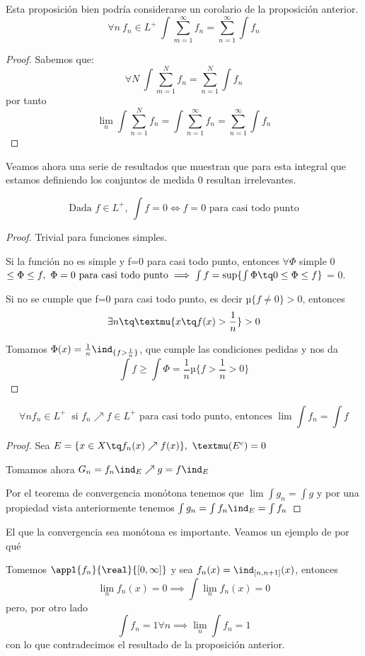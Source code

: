 \documentclass{apuntes}
\begin{document}
\begin{prop}
Esta proposición bien podría considerarse un corolario de la proposición anterior.
\[\forall n \ f_n \in L^+   \ \int \sum_{m=1}^{\infty}f_n = \sum_{n=1}^{\infty}\int f_n\]
\end{prop}
\begin{proof}

Sabemos que:
\[\forall N \  \int \sum_{m=1}^{N}f_n = \sum_{n=1}^{N}\int f_n \]
por tanto
\[\lim_n \int \sum_{n=1}^{N}f_n = \int \sum_{n=1}^{\infty} f_n = \sum_{n=1}^{\infty}\int f_n\]
\end{proof}

Veamos ahora una serie de resultados que muestran que para esta integral que estamos definiendo los conjuntos de medida 0 resultan irrelevantes.

\begin{prop}
\[\text{Dada }f \in L^+, \ \int f=0 \iff f=0 \text{ para casi todo punto}\]
\end{prop}
\begin{proof}
Trivial para funciones simples.

Si la función no es simple y f=0 para casi todo punto, entonces $\forall \Phi$ simple 0$\leq \Phi \leq f, \ \Phi=0 \text{ para casi todo punto} \implies \int f = \sup\{\int \Phi \tq 0 \leq \Phi \leq f\}$ = 0.

Si no se cumple que f=0 para casi todo punto, es decir $µ\{f\neq 0\}>0$, entonces
\[\exists n \tq µ\{x \tq f(x) > \frac{1}{n}\}>0\]

Tomamos $\Phi(x)=\frac{1}{n}\ind_{\{f > \frac{1}{n}\}}$, que cumple las condiciones pedidas y nos da
\[\int f \geq \int \Phi = \frac{1}{n}µ\{f>\frac{1}{n} > 0\}\]
\end{proof}

\begin{prop}
\[\forall n f_n \in L^+ \ \text{ si } f_n \nearrow f \in L^+ \text{ para casi todo punto, entonces } \lim \int f_n = \int f\]
\end{prop}
\begin{proof}
Sea $E = \{x \in X \tq f_n(x) \nearrow f(x)\}, \ µ(E^c)=0$

Tomamos ahora $G_n = f_n \ind_{E} \nearrow g=f\ind_E$

Por el teorema de convergencia monótona tenemos que $\lim \int g_n = \int g$ y por una propiedad vista anteriormente tenemos $\int g_n = \int f_n \ind_E = \int f_n$

\end{proof}

\obs El que la convergencia sea monótona es importante. Veamos un ejemplo de por qué
\begin{example}
Tomemos $\appl{f_n}{\real}{[0, \infty]}$ y sea $f_n(x) = \ind_{[n,n+1]}(x)$, entonces
\[\lim_n f_n(x) = 0 \implies \int \lim_n f_n(x) = 0\]
pero, por otro lado
\[\int f_n=1 \forall n \implies \lim_n \int f_n = 1\]
con lo que contradecimos el resultado de la proposición anterior.
\end{example}
\end{document}
